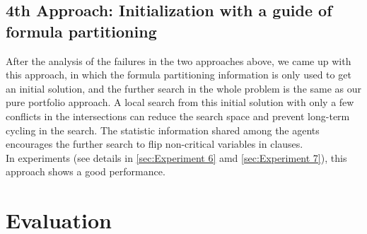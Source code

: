 \documentclass[12pt,a4paper,twoside]{scrartcl}
\numberwithin{equation}{section}
\begin{document}
\subsection{4th Approach: Initialization with a guide of formula partitioning}
\label{sec:4th}
After the analysis of the failures in the two approaches above, we came up with this approach, in which the formula partitioning information is only used to get an initial solution, and the further search in the whole problem is the same as our pure portfolio approach. A local search from this initial solution with only a few conflicts in the intersections can reduce the search space and prevent long-term cycling in the search. The statistic information shared among the agents encourages the further search to flip non-critical variables in clauses. \\
In experiments (see details in \ref{sec:Experiment 6} amd \ref{sec:Experiment 7}), this approach shows a good performance.

\clearpage
\section{Evaluation} 
\label{sec:eva}
\end{document}
